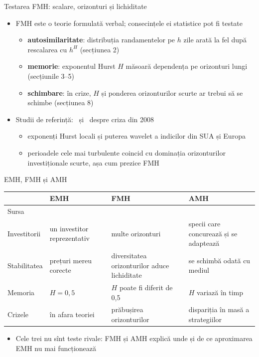 \begin{frame}{Testarea FMH: scalare, orizonturi și lichiditate}
\itemsize{\small}
\begin{itemize}
    \item FMH este o teorie formulată verbal; consecințele ei statistice pot fi testate
    \begin{itemize}
        \item \textbf{autosimilaritate}: distribuția randamentelor pe $h$ zile arată la fel după rescalarea cu $h^H$ (secțiunea 2)
        \item \textbf{memorie}: exponentul Hurst $H$ măsoară dependența pe orizonturi lungi (secțiunile 3--5)
        \item \textbf{schimbare}: în crize, $H$ și ponderea orizonturilor scurte ar trebui să se schimbe (secțiunea 8)
    \end{itemize}
    \item Studii de referință: \ și \ despre criza din 2008
    \begin{itemize}
        \item exponenți Hurst locali și puterea wavelet a indicilor din SUA și Europa
        \item perioadele cele mai turbulente coincid cu dominația orizonturilor investiționale scurte, așa cum prezice FMH
    \end{itemize}
\end{itemize}
\end{frame}

\begin{frame}{EMH, FMH și AMH}
\itemsize{\small}
\begin{center}
\footnotesize
\begin{tabular}{>{\raggedright\arraybackslash}p{2.2cm}>{\raggedright\arraybackslash}p{2.9cm}>{\raggedright\arraybackslash}p{2.9cm}>{\raggedright\arraybackslash}p{2.9cm}}
\toprule
 & \textbf{EMH} & \textbf{FMH} & \textbf{AMH} \\
\midrule
Sursa & {} & {} & {} \\
Investitorii & un investitor reprezentativ & multe orizonturi & specii care concurează și se adaptează \\
Stabilitatea & prețuri mereu corecte & diversitatea orizonturilor aduce lichiditate & se schimbă odată cu mediul \\
Memoria & $H = 0{,}5$ & $H$ poate fi diferit de 0,5 & $H$ variază în timp \\
Crizele & în afara teoriei & prăbușirea orizonturilor & dispariția în masă a strategiilor \\
\bottomrule
\end{tabular}
\end{center}
\begin{itemize}
    \item Cele trei nu sînt teste rivale: FMH și AMH explică unde și de ce aproximarea EMH nu mai funcționează
\end{itemize}
\end{frame}



